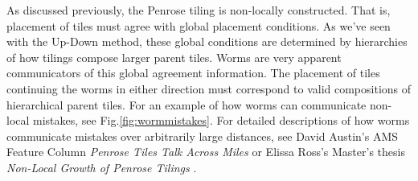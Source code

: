 \documentclass[
  oneside,
  11pt, a4paper,
  footinclude=true,
  headinclude=true,
  cleardoublepage=empty
]{scrbook}
\begin{document}
As discussed previously, the Penrose tiling is non-locally constructed. That is, placement of tiles must agree with global placement conditions. As we've seen with the Up-Down method, these global conditions are determined by hierarchies of how tilings compose larger parent tiles. Worms are very apparent communicators of this global agreement information. The placement of tiles continuing the worms in either direction must correspond to valid compositions of hierarchical parent tiles. For an example of how worms can communicate non-local mistakes, see Fig.\ref{fig:wormmistakes}. For detailed descriptions of how worms communicate mistakes over arbitrarily large distances, see David Austin's AMS Feature Column \textit{Penrose Tiles Talk Across Miles} \cite{Austin2007} or Elissa Ross's Master's thesis \textit{Non-Local Growth of Penrose Tilings} \cite{Ross}.
\end{document}
